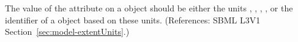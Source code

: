 The value of the attribute  on a \Model object should be
either the units , , ,
, or the identifier of a \UnitDefinition object based on
these units.  (References: SBML L3V1 Section~\ref{sec:model-extentUnits}.)
